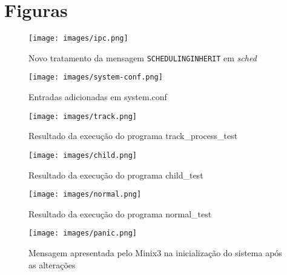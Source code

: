 \documentclass[journal]{IEEEtran}
\begin{document}
\clearpage

\appendices
\section{Figuras}

\begin{figure}[H]
    \centering
    \texttt{[image: images/ipc.png]}
    \caption{Novo tratamento da mensagem \texttt{SCHEDULING\textunderscore INHERIT} em \textit{sched}}
    \label{fig:ipc}
\end{figure}

\begin{figure}[H]
    \centering
    \texttt{[image: images/system-conf.png]}
    \caption{Entradas adicionadas em system.conf}
    \label{fig:systemconf}
\end{figure}

\begin{figure}[H]
    \centering
    \texttt{[image: images/track.png]}
    \caption{Resultado da execução do programa track\_process\_test}
    \label{fig:track}
\end{figure}

\begin{figure}[H]
    \centering
    \texttt{[image: images/child.png]}
    \caption{Resultado da execução do programa child\_test}
    \label{fig:child}
\end{figure}

\begin{figure}[H]
    \centering
    \texttt{[image: images/normal.png]}
    \caption{Resultado da execução do programa normal\_test}
    \label{fig:normal}
\end{figure}

\begin{figure}[H]
    \centering
    \texttt{[image: images/panic.png]}
    \caption{Mensagem apresentada pelo Minix3 na inicialização do sistema após as alterações}
    \label{fig:panic}
\end{figure}

\printbibliography[title=Bibliografia]
\end{document}

